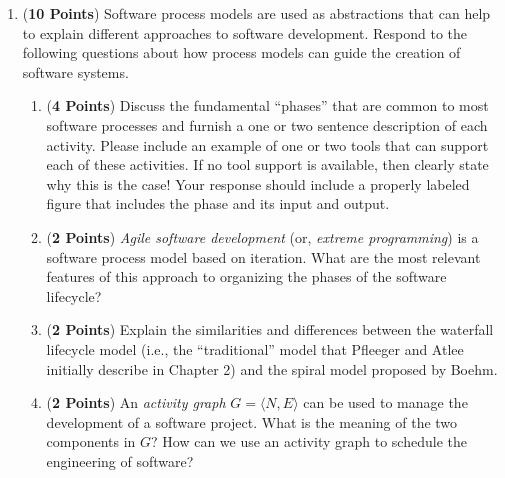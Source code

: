 \documentclass[12pt,epsf,psfig,graphics]{article}
\begin{document}
\begin{enumerate}
\newpage

\item ({\bf 10 Points}) Software process models are used as
  abstractions that can help to explain different approaches to
  software development. Respond to the following questions about how
  process models can guide the creation of software systems.

        \begin{enumerate}
          
        \item ({\bf 4 Points}) Discuss the fundamental ``phases'' that
          are common to most software processes and furnish a one or
          two sentence description of each activity.  Please include
          an example of one or two tools that can support each of
          these activities. If no tool support is available, then
          clearly state why this is the case!  Your response should
          include a properly labeled figure that includes the phase
          and its input and output.
          

        \item ({\bf 2 Points}) {\em Agile software development} (or,
          {\em extreme programming}) is a software process model based
          on iteration.  What are the most relevant features of this
          approach to organizing the phases of the software lifecycle?

        \item ({\bf 2 Points}) Explain the similarities and
          differences between the waterfall lifecycle model (i.e., the
          ``traditional'' model that Pfleeger and Atlee initially
          describe in Chapter 2) and the spiral model proposed by
          Boehm.

	\item ({\bf 2 Points}) An {\em activity graph} $G = \langle N, E \rangle$ can be used to manage the development
	  of a software project. What is the meaning of the two components in $G$?  How can we use an activity graph to
	  schedule the engineering of software?



\end{enumerate}
\end{enumerate}
\end{document}
